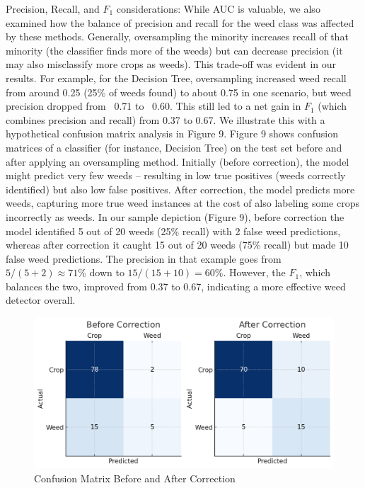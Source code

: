 \documentclass[agriengineering,article,submit,pdftex,moreauthors]{Definitions/mdpi}
\begin{document}
Precision, Recall, and $F_{1}$ considerations: While AUC is valuable, we also examined how the balance of precision and recall for the weed class was affected by these methods. Generally, oversampling the minority increases recall of that minority (the classifier finds more of the weeds) but can decrease precision (it may also misclassify more crops as weeds). This trade-off was evident in our results. For example, for the Decision Tree, oversampling increased weed recall from around 0.25 (25\% of weeds found) to about 0.75 in one scenario, but weed precision dropped from ~0.71 to ~0.60. This still led to a net gain in $F_{1}$ (which combines precision and recall) from 0.37 to 0.67. We illustrate this with a hypothetical confusion matrix analysis in Figure 9. Figure 9 shows confusion matrices of a classifier (for instance, Decision Tree) on the test set before and after applying an oversampling method. Initially (before correction), the model might predict very few weeds – resulting in low true positives (weeds correctly identified) but also low false positives. After correction, the model predicts more weeds, capturing more true weed instances at the cost of also labeling some crops incorrectly as weeds. In our sample depiction (Figure 9), before correction the model identified 5 out of 20 weeds (25\% recall) with 2 false weed predictions, whereas after correction it caught 15 out of 20 weeds (75\% recall) but made 10 false weed predictions. The precision in that example goes from $5/(5+2) \approx 71\%$ down to $15/(15+10) = 60\%$. However, the $F_{1}$, which balances the two, improved from 0.37 to 0.67, indicating a more effective weed detector overall.

\begin{figure}[H]
	\centering
	\includegraphics[width=0.9\linewidth]{./figures/confusion.png}
	\caption[Confusion Matrix]{Confusion Matrix Before and After Correction}
	\label{fig:confusion}
\end{figure}
\end{document}

